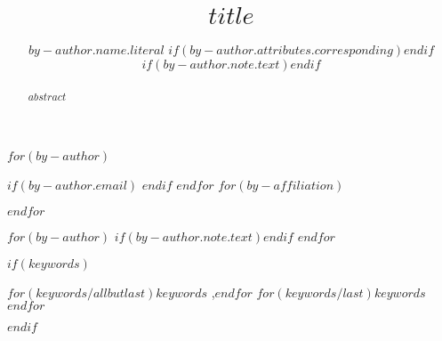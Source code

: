 \begin{frontmatter}
    \title{$title$}
    $for(by-author)$\author[$for(by-author.affiliations)$$it.number$$endfor$]{$by-author.name.literal$%
    $if(by-author.attributes.corresponding)$$endif$%
    $if(by-author.note.text)$$endif$}
    $if(by-author.email)$  $endif$
    $endfor$
    $for(by-affiliation)$
    
    $endfor$
    
    $for(by-author)$
    $if(by-author.note.text)$$endif$
    $endfor$
           
    \begin{abstract}
    $abstract$
    \end{abstract}
    $if(keywords)$
    \begin{keyword}
        $for(keywords/allbutlast)$$keywords$ \sep $endfor$
        $for(keywords/last)$$keywords$$endfor$
    \end{keyword}
    $endif$
\end{frontmatter}